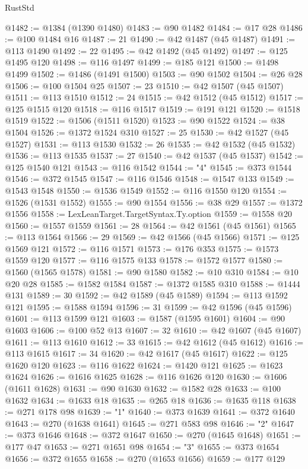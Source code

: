 \begin{lexlean}{RustStd}
\begin{coremodule}
@1482 := @1384 (@1390 @1480)
@1483 := @90 @1482
@1484 := @17 @28
@1486 := @100 @1484 @16
@1487 := 21
@1490 := @42 @1487 (@45 @1487)
@1491 := @113 @1490
@1492 := 22
@1495 := @42 @1492 (@45 @1492)
@1497 := @125 @1495 @120
@1498 := @116 @1497
@1499 := @185 @121
@1500 := @1498 @1499
@1502 := @1486 (@1491 @1500)
@1503 := @90 @1502
@1504 := @26 @28
@1506 := @100 @1504 @25
@1507 := 23
@1510 := @42 @1507 (@45 @1507)
@1511 := @113 @1510
@1512 := 24
@1515 := @42 @1512 (@45 @1512)
@1517 := @125 @1515 @120
@1518 := @116 @1517
@1519 := @191 @121
@1520 := @1518 @1519
@1522 := @1506 (@1511 @1520)
@1523 := @90 @1522
@1524 := @38 @1504
@1526 := @1372 @1524 @310
@1527 := 25
@1530 := @42 @1527 (@45 @1527)
@1531 := @113 @1530
@1532 := 26
@1535 := @42 @1532 (@45 @1532)
@1536 := @113 @1535
@1537 := 27
@1540 := @42 @1537 (@45 @1537)
@1542 := @125 @1540 @121
@1543 := @116 @1542
@1544 := "4"
@1545 := @373 @1544
@1546 := @372 @1545
@1547 := @116 @1546
@1548 := @1547 @133
@1549 := @1543 @1548
@1550 := @1536 @1549
@1552 := @116 @1550 @120
@1554 := @1526 (@1531 @1552)
@1555 := @90 @1554
@1556 := @38 @29
@1557 := @1372 @1556
@1558 := LexLeanTarget.TargetSyntax.Ty.option
@1559 := @1558 @20
@1560 := @1557 @1559
@1561 := 28
@1564 := @42 @1561 (@45 @1561)
@1565 := @113 @1564
@1566 := 29
@1569 := @42 @1566 (@45 @1566)
@1571 := @125 @1569 @121
@1572 := @116 @1571
@1573 := @176 @353
@1575 := @1573 @1559 @120
@1577 := @116 @1575 @133
@1578 := @1572 @1577
@1580 := @1560 (@1565 @1578)
@1581 := @90 @1580
@1582 := @10 @310
@1584 := @10 @20 @28
@1585 := @1582 @1584
@1587 := @1372 @1585 @310
@1588 := @1444 @131
@1589 := 30
@1592 := @42 @1589 (@45 @1589)
@1594 := @113 @1592 @121
@1595 := @1588 @1594
@1596 := 31
@1599 := @42 @1596 (@45 @1596)
@1601 := @113 @1599 @121
@1603 := @1587 (@1595 @1601)
@1604 := @90 @1603
@1606 := @100 @52 @13
@1607 := 32
@1610 := @42 @1607 (@45 @1607)
@1611 := @113 @1610
@1612 := 33
@1615 := @42 @1612 (@45 @1612)
@1616 := @113 @1615
@1617 := 34
@1620 := @42 @1617 (@45 @1617)
@1622 := @125 @1620 @120
@1623 := @116 @1622
@1624 := @1420 @121
@1625 := @1623 @1624
@1626 := @1616 @1625
@1628 := @116 @1626 @120
@1630 := @1606 (@1611 @1628)
@1631 := @90 @1630
@1632 := @1582 @28
@1633 := @100 @1632
@1634 := @1633 @18
@1635 := @265 @18
@1636 := @1635 @118
@1638 := @271 @178 @98
@1639 := "1"
@1640 := @373 @1639
@1641 := @372 @1640
@1643 := @270 (@1638 @1641)
@1645 := @271 @583 @98
@1646 := "2"
@1647 := @373 @1646
@1648 := @372 @1647
@1650 := @270 (@1645 @1648)
@1651 := @177 @47
@1653 := @271 @1651 @98
@1654 := "3"
@1655 := @373 @1654
@1656 := @372 @1655
@1658 := @270 (@1653 @1656)
@1659 := @177 @129

\end{coremodule}
\end{lexlean}
